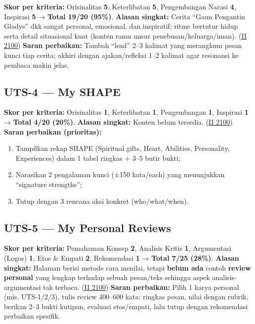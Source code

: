 \documentclass[
  letterpaper,
  DIV=11,
  numbers=noendperiod]{scrreprt}
\providecommand{\tightlist}{%
  \setlength{\itemsep}{0pt}\setlength{\parskip}{0pt}}
\begin{document}
\textbf{Skor per kriteria:} Orisinalitas \textbf{5}, Keterlibatan
\textbf{5}, Pengembangan Narasi \textbf{4}, Inspirasi \textbf{5} →
\textbf{Total 19/20 (95\%)}. \textbf{Alasan singkat:} Cerita ``Gaun
Pengantin Gladys'' dkk sangat personal, emosional, dan inspiratif; ritme
bertutur hidup serta detail situasional kuat (konten ramu unsur
penebusan/keluarga/iman).
(\href{https://ii-2100.github.io/all-about-me/My_Stories_for_You/index.html}{II
2100}) \textbf{Saran perbaikan:} Tambah ``lead'' 2--3 kalimat yang
merangkum pesan kunci tiap cerita; akhiri dengan ajakan/refleksi 1--2
kalimat agar resonansi ke pembaca makin jelas.

\subsection{UTS-4 --- My SHAPE}\label{uts-4-my-shape}

\textbf{Skor per kriteria:} Orisinalitas \textbf{1}, Keterlibatan
\textbf{1}, Pengembangan \textbf{1}, Inspirasi \textbf{1} →
\textbf{Total 4/20 (20\%)}. \textbf{Alasan singkat:} Konten belum
tersedia.
(\href{https://ii-2100.github.io/all-about-me/My_Shapes/index.html}{II
2100}) \textbf{Saran perbaikan (prioritas):}

\begin{enumerate}
\def\labelenumi{\arabic{enumi}.}
\tightlist
\item
  Tampilkan rekap SHAPE (Spiritual gifts, Heart, Abilities, Personality,
  Experiences) dalam 1 tabel ringkas + 3--5 butir bukti;
\item
  Narasikan 2 pengalaman kunci (±150 kata/each) yang menunjukkan
  ``signature strengths'';
\item
  Tutup dengan 3 rencana aksi konkret (who/what/when).
\end{enumerate}

\subsection{UTS-5 --- My Personal
Reviews}\label{uts-5-my-personal-reviews-1}

\textbf{Skor per kriteria:} Pemahaman Konsep \textbf{2}, Analisis Kritis
\textbf{1}, Argumentasi (Logos) \textbf{1}, Etos \& Empati \textbf{2},
Rekomendasi \textbf{1} → \textbf{Total 7/25 (28\%)}. \textbf{Alasan
singkat:} Halaman berisi metode cara menilai, tetapi \textbf{belum ada}
contoh \textbf{review personal} yang lengkap terhadap sebuah pesan/teks
sehingga aspek analisis-argumentasi tak terbaca.
(\href{https://ii-2100.github.io/all-about-me/My_Personal_Reviews/index.html}{II
2100}) \textbf{Saran perbaikan:} Pilih 1 karya personal (mis.
UTS-1/2/3), tulis review 400--600 kata: ringkas pesan, nilai dengan
rubrik, berikan 2--3 bukti kutipan, evaluasi etos/empati, lalu tutup
dengan rekomendasi perbaikan spesifik.
\end{document}
